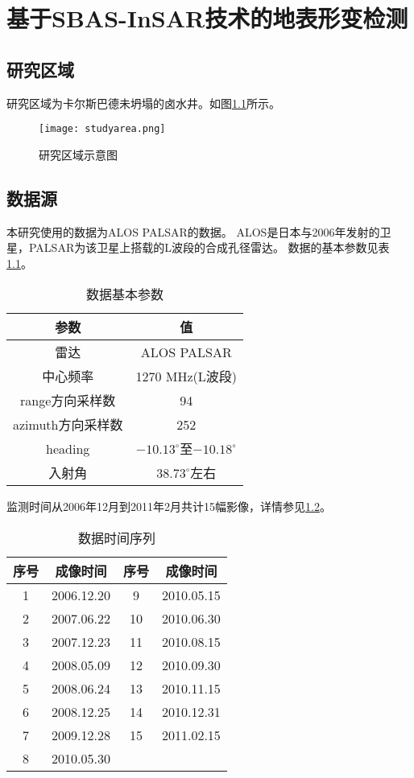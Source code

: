 \chapter{基于SBAS-InSAR技术的地表形变检测}

\section{研究区域}

研究区域为卡尔斯巴德未坍塌的卤水井。如图\ref{fig:studyarea}所示。
\begin{figure}[htb]
    \centering
    \texttt{[image: studyarea.png]}
    \caption{研究区域示意图}
    \label{fig:studyarea}
\end{figure}

\section{数据源}

本研究使用的数据为ALOS PALSAR的数据。
ALOS是日本与2006年发射的卫星，PALSAR为该卫星上搭载的L波段的合成孔径雷达。
数据的基本参数见表\ref{tab:palsar}。
\begin{table}[htb]
    \centering\small
    \caption{数据基本参数}
    \label{tab:palsar}
    \begin{tabular}{@{}cc@{}}
    \toprule
    参数           & 值                                \\ 
    \midrule
    雷达           & ALOS PALSAR                      \\
    中心频率         & 1270 MHz(L波段)                    \\
    range方向采样数   & 94                               \\
    azimuth方向采样数 & 252                              \\
    heading      & $-10.13^{\circ}$至$-10.18^{\circ}$ \\
    入射角          & $38.73^{\circ}$左右  \\
    \bottomrule
    \end{tabular}
\end{table}
监测时间从2006年12月到2011年2月共计15幅影像，详情参见\ref{tab:timeseries}。
\begin{table}[htb]
    \centering\small
    \caption{数据时间序列}
    \label{tab:timeseries}
    \begin{tabular}{@{}cccc@{}}
    \toprule
    序号 & 成像时间 & 序号 & 成像时间\\ 
    \midrule
    1 & 2006.12.20 & 9 & 2010.05.15 \\
    2 & 2007.06.22 & 10 & 2010.06.30 \\
    3 & 2007.12.23 & 11 & 2010.08.15 \\
    4 & 2008.05.09 & 12 & 2010.09.30 \\
    5 & 2008.06.24 & 13 & 2010.11.15 \\
    6 & 2008.12.25 & 14 & 2010.12.31 \\
    7 & 2009.12.28 & 15 & 2011.02.15 \\
    8 & 2010.05.30 & & \\
    \bottomrule
    \end{tabular}
\end{table}

